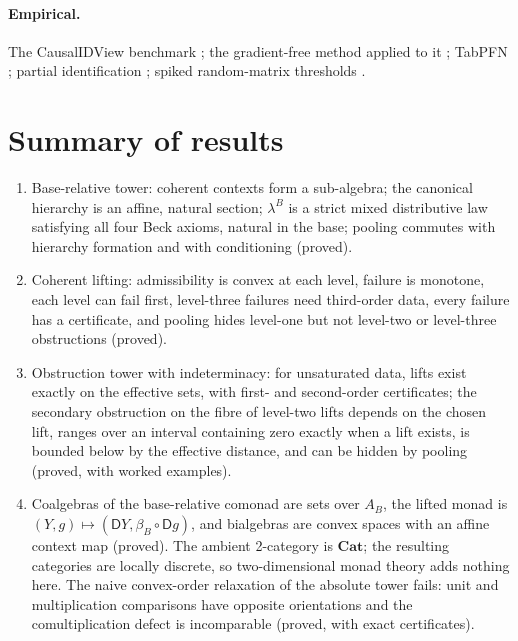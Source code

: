 \documentclass[11pt]{article}
\theoremstyle{definition}
\theoremstyle{remark}
\newcommand{\D}{\mathsf{D}}
\begin{document}
\paragraph{Empirical.} The CausalIDView benchmark \cite{Jung2026}; the gradient-free method applied
to it \cite[Section~51]{Awasthi-ThreeLayers}; TabPFN \cite{Hollmann2023}; partial
identification \cite{Manski1990}; spiked random-matrix thresholds \cite{BBP2005}.

\section{Summary of results}

\begin{enumerate}[leftmargin=*]
\item Base-relative tower: coherent contexts form a sub-algebra; the canonical hierarchy is an
  affine, natural section; $\lambda^B$ is a strict mixed distributive law satisfying all four Beck
  axioms, natural in the base; pooling commutes with hierarchy formation and with conditioning
  (proved).
\item Coherent lifting: admissibility is convex at each level, failure is monotone, each level can
  fail first, level-three failures need third-order data, every failure has a certificate, and pooling
  hides level-one but not level-two or level-three obstructions (proved).
\item Obstruction tower with indeterminacy: for unsaturated data, lifts exist exactly on the effective
  sets, with first- and second-order certificates; the secondary obstruction on the fibre of level-two
  lifts depends on the chosen lift, ranges over an interval containing zero exactly when a lift exists,
  is bounded below by the effective distance, and can be hidden by pooling (proved, with worked
  examples).
\item Coalgebras of the base-relative comonad are sets over $A_B$, the lifted monad is
  $(Y,g)\mapsto(\D Y,\beta_B\circ\D g)$, and bialgebras are convex spaces with an affine context map
  (proved). The ambient 2-category is $\mathbf{Cat}$; the resulting categories are locally discrete,
  so two-dimensional monad theory adds nothing here. The naive convex-order relaxation of the
  absolute tower fails: unit and multiplication comparisons have opposite orientations and the
  comultiplication defect is incomparable (proved, with exact certificates).

\end{enumerate}
\end{document}
